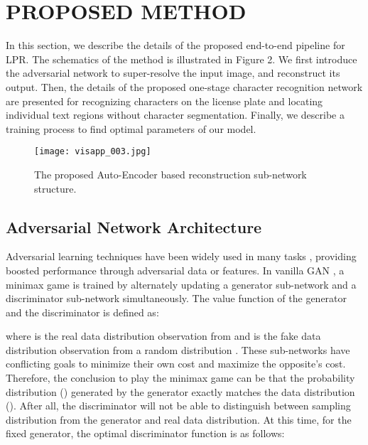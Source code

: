 \documentclass[a4paper,twoside]{article}
\begin{document}
\section{\uppercase{Proposed Method}}

In this section, we describe the details of the proposed end-to-end pipeline for LPR. The schematics of the method is illustrated in Figure 2. We first  introduce the adversarial network to super-resolve the input image, and reconstruct its output. Then, the details of the proposed one-stage character recognition network are presented for recognizing characters on the license plate and locating individual text regions without character segmentation. Finally, we describe a training process to find optimal parameters of our model.

\begin{figure*}[t]
    \begin{center}
\texttt{[image: visapp\_003.jpg]}
    \end{center}
       \caption{The proposed Auto-Encoder based reconstruction sub-network structure.}
    \label{fig:long}
    \label{fig:onecol}
    \end{figure*}
    
\subsection{Adversarial Network Architecture}
    Adversarial learning techniques have been widely used in many tasks \cite{frid2018gan,zhu2017unpaired,rajeswar2017adversarial,chou2017self}, providing boosted performance through adversarial data or features. In vanilla GAN \cite{goodfellow2014generative}, a minimax game is trained by alternately updating a generator sub-network  and a discriminator sub-network  simultaneously. The value function of the generator  and the discriminator  is defined as:

    where  is the real data distribution observation from  and  is the fake data distribution observation from a random distribution . These sub-networks have conflicting goals to minimize their own cost and maximize the opposite's cost. Therefore, the conclusion to play the minimax game can be that the probability distribution () generated by the generator  exactly matches the data distribution (). After all, the discriminator  will not be able to distinguish between sampling distribution from the generator  and real data distribution. At this time, for the fixed generator, the optimal discriminator function is as follows:
\end{document}
